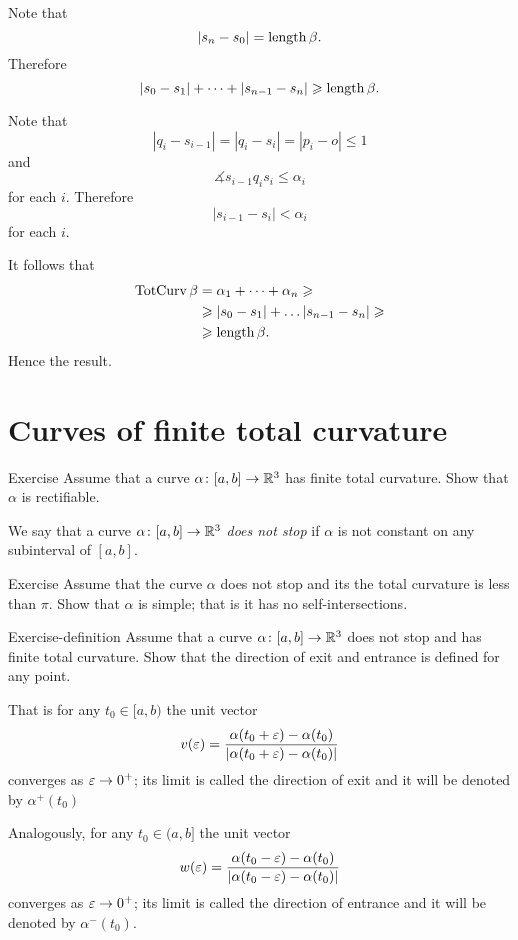 Note that 
\[|s_n-s_0|=\mathop{\rm length}\nolimits \beta.\]
Therefore 
\[|s_0-s_1|+\dots+|s_{n-1}-s_n|\geqslant \mathop{\rm length}\nolimits \beta.\]

Note that 
\[|q_i-s_{i-1}|=|q_i-s_i|=|p_i-o|\le 1\]
and
\[\measuredangle s_{i-1}q_is_i\le \alpha_i\]
for each $i$.
Therefore 
\[|s_{i-1}-s_i|<\alpha_i\]
for each $i$.

It follows that
\begin{align*}
\mathop{\rm TotCurv}\nolimits \beta
&=\alpha_1+\dots+\alpha_n\geqslant
\\
&\geqslant |s_{0}-s_1|+\dots |s_{n-1}-s_n|\geqslant 
\\
&\geqslant\mathop{\rm length}\nolimits \beta.
\end{align*}
Hence the result.
\qeds

\section{Curves of finite total curvature}

\begin{thm}{Exercise} 
Assume that a curve $\alpha\colon[a,b]\to\mathbb{R}^3$ has finite total curvature.
 Show that $\alpha$ is rectifiable.
\end{thm}

We say that a curve $\alpha\colon[a,b]\to\mathbb{R}^3$ \emph{does not stop} if $\alpha$ is not constant on any subinterval of $[a,b]$. 

\begin{thm}{Exercise} 
Assume that the curve $\alpha$ does not stop and its the total curvature is less than $\pi$.
Show that $\alpha$ is simple; that is it has no self-intersections.
\end{thm}

\begin{thm}{Exercise-definition} 
Assume that a curve $\alpha\colon[a,b]\to\mathbb{R}^3$ does not stop and has finite total curvature.
Show that the direction of exit and entrance is defined for any point.

That is for any $t_0\in [a,b)$ the unit vector  
\[v(\varepsilon)=\frac{\alpha(t_0+\varepsilon)-\alpha(t_0)}{|\alpha(t_0+\varepsilon)-\alpha(t_0)|}\] converges as $\varepsilon\to0^+$;
its limit is called the direction of exit and it will be denoted by $\alpha^+(t_0)$

Analogously, for any $t_0\in (a,b]$ the unit vector  
\[w(\varepsilon)=\frac{\alpha(t_0-\varepsilon)-\alpha(t_0)}{|\alpha(t_0-\varepsilon)-\alpha(t_0)|}\] 
converges as $\varepsilon\to0^+$;
its limit is called the direction of entrance and it will be denoted by $\alpha^-(t_0)$.
\end{thm}

